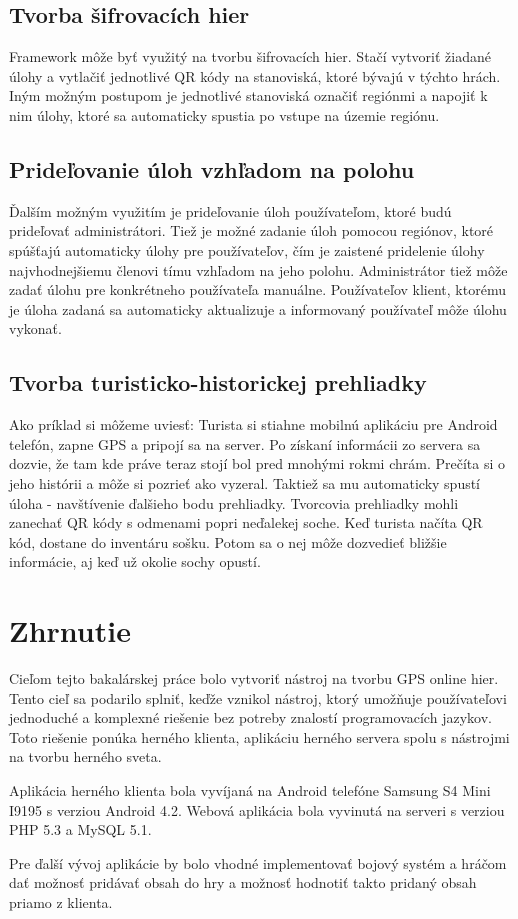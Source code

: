\subsection{Tvorba šifrovacích hier}
Framework môže byť využitý na tvorbu šifrovacích hier. Stačí vytvoriť žiadané úlohy a vytlačiť jednotlivé QR kódy na stanoviská, ktoré bývajú v týchto hrách. Iným možným postupom je jednotlivé stanoviská označiť regiónmi a napojiť k nim úlohy, ktoré sa automaticky spustia po vstupe na územie regiónu.


\subsection{Prideľovanie úloh vzhľadom na polohu}
Ďalším možným využitím je prideľovanie úloh používateľom, ktoré budú prideľovať administrátori. Tiež je možné zadanie úloh pomocou regiónov, ktoré spúšťajú automaticky úlohy pre používateľov, čím je zaistené pridelenie úlohy najvhodnejšiemu členovi tímu vzhľadom na jeho polohu. Administrátor tiež môže zadať úlohu pre konkrétneho používateľa manuálne. Používateľov klient, ktorému je úloha zadaná sa automaticky aktualizuje a informovaný používateľ môže úlohu vykonať.


\subsection{Tvorba turisticko-historickej prehliadky}
Ako príklad si môžeme uviesť: Turista si stiahne mobilnú aplikáciu pre Android telefón, zapne GPS a pripojí sa na server. Po získaní informácii zo servera sa dozvie, že tam kde práve teraz stojí bol pred mnohými rokmi chrám. Prečíta si o jeho histórii a môže si pozrieť ako vyzeral. Taktiež sa mu automaticky spustí úloha - navštívenie ďalšieho bodu prehliadky. Tvorcovia prehliadky mohli zanechať QR kódy s odmenami popri neďalekej soche. Keď turista načíta  QR kód, dostane do inventáru sošku. Potom sa o nej môže dozvedieť bližšie informácie, aj keď už okolie sochy opustí. 

\section{Zhrnutie}
Cieľom tejto bakalárskej práce bolo vytvoriť nástroj na tvorbu GPS online hier. Tento cieľ sa podarilo splniť, keďže vznikol nástroj, ktorý umožňuje používateľovi jednoduché a komplexné riešenie bez potreby znalostí programovacích jazykov. Toto riešenie ponúka herného klienta, aplikáciu herného servera spolu s nástrojmi na tvorbu herného sveta. \

Aplikácia herného klienta bola vyvíjaná na Android telefóne Samsung S4 Mini I9195 s verziou Android 4.2. Webová aplikácia bola vyvinutá na serveri s verziou PHP 5.3 a MySQL 5.1. \

Pre ďalší vývoj aplikácie by bolo vhodné implementovať bojový systém a hráčom dať možnosť pridávať obsah do hry a možnosť hodnotiť takto pridaný obsah priamo z klienta.